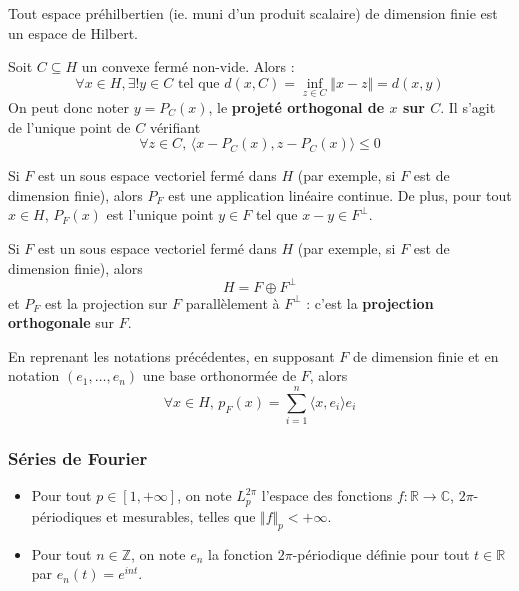   \begin{example}
    Tout espace préhilbertien (ie. muni d'un produit scalaire) de dimension finie est un espace de Hilbert.
  \end{example}

  \begin{theorem}
    Soit $C \subseteq H$ un convexe fermé non-vide. Alors :
    \[ \forall x \in H, \exists! y \in C \text{ tel que } d(x, C) = \inf_{z \in C} \Vert x - z \Vert = d(x, y) \]
    On peut donc noter $y = P_C(x)$, le \textbf{projeté orthogonal de $x$ sur $C$}. Il s'agit de l'unique point de $C$ vérifiant
    \[ \forall z \in C, \, \langle x - P_C(x), z - P_C(x) \rangle \leq 0 \]
  \end{theorem}

  \begin{theorem}
    Si $F$ est un sous espace vectoriel fermé dans $H$ (par exemple, si $F$ est de dimension finie), alors $P_F$ est une application linéaire continue. De plus, pour tout $x \in H$, $P_F(x)$ est l'unique point $y \in F$ tel que $x-y \in F^\perp$.
  \end{theorem}

  \begin{theorem}
    Si $F$ est un sous espace vectoriel fermé dans $H$ (par exemple, si $F$ est de dimension finie), alors
    \[ H = F \oplus F^\perp \]
    et $P_F$ est la projection sur $F$ parallèlement à $F^\perp$ : c'est la \textbf{projection orthogonale} sur $F$.
  \end{theorem}


  \begin{remark}
    En reprenant les notations précédentes, en supposant $F$ de dimension finie et en notation $(e_1, \dots, e_n)$ une base orthonormée de $F$, alors
    \[ \forall x \in H, \, p_F(x) = \sum_{i=1}^{n} \langle x, e_i \rangle e_i \]
  \end{remark}

  \subsubsection{Séries de Fourier}


  \begin{notation}
    \begin{itemize}
      \item Pour tout $p \in [1, +\infty]$, on note $L_p^{2\pi}$ l'espace des fonctions $f : \mathbb{R} \rightarrow \mathbb{C}$, $2\pi$-périodiques et mesurables, telles que $\Vert f \Vert_p < +\infty$.
      \item Pour tout $n \in \mathbb{Z}$, on note $e_n$ la fonction $2\pi$-périodique définie pour tout $t \in \mathbb{R}$ par $e_n(t) = e^{int}$.
    \end{itemize}
  \end{notation}

